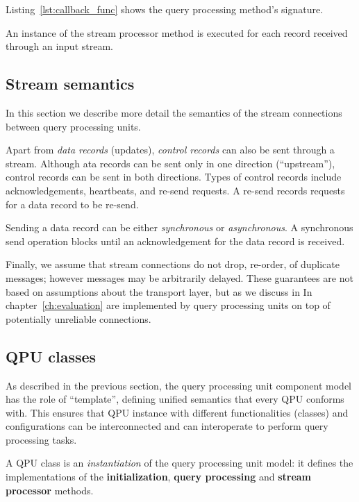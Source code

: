 \noindent
Listing~\ref{lst:callback_func} shows the query processing method's signature.

An instance of the stream processor method is executed for each record received through an input stream.

\subsection{Stream semantics}

In this section we describe more detail the semantics of the stream connections between query processing units.

\medskip
\noindent
Apart from \textit{data records} (updates), \textit{control records} can also be sent through a stream.
Although ata records can be sent only in one direction (``upstream''), control records can be sent in both directions.
Types of control records include acknowledgements, heartbeats, and re-send requests.
A re-send records requests for a data record to be re-send.

\medskip
\noindent
Sending a data record can be either \textit{synchronous} or \textit{asynchronous}.
A synchronous send operation blocks until an acknowledgement for the data record is received.

\medskip
\noindent
Finally, we assume that stream connections do not drop, re-order, of duplicate messages;
however messages may be arbitrarily delayed.
These guarantees are not based on assumptions about the transport layer, but as we discuss in In chapter~\ref{ch:evaluation}
are implemented by query processing units on top of potentially unreliable connections.

\subsection{QPU classes}
\label{sec:qpu_classes}

As described in the previous section, the query processing unit component model has the role of ``template'',
defining unified semantics that every QPU conforms with.
This ensures that QPU instance with different functionalities (classes) and configurations can be interconnected and
can interoperate to perform query processing tasks.

A QPU class is an \textit{instantiation} of the query processing unit model:
it defines the implementations of the \textbf{initialization}, \textbf{query processing} and \textbf{stream processor}
methods.


